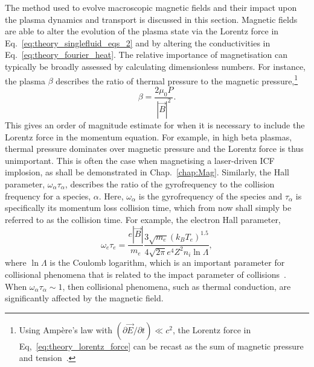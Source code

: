 The method used to evolve macroscopic magnetic fields and their impact upon the plasma dynamics and transport is discussed in this section.
Magnetic fields are able to alter the evolution of the plasma state via the Lorentz force in Eq.~\ref{eq:theory_singlefluid_eqs_2} and by altering the conductivities in Eq.~\ref{eq:theory_fourier_heat}.
The relative importance of magnetisation can typically be broadly assessed by calculating dimensionless numbers.
For instance, the plasma $\beta$ describes the ratio of thermal pressure to the magnetic pressure,\footnote{Using Amp\`ere's law with $(\partial \vec{E} / \partial t) \ll c^2$, the Lorentz force in Eq,~\ref{eq:theory_lorentz_force} can be recast as the sum of magnetic pressure and tension~\cite{oneill_modelling_2023}.}
\begin{equation}
    \beta = \frac{2 \mu_0 P}{|\vec{B}|^2}.
\end{equation}
This gives an order of magnitude estimate for when it is necessary to include the Lorentz force in the momentum equation.
For example, in high beta plasmas, thermal pressure dominates over magnetic pressure and the Lorentz force is thus unimportant.
This is often the case when magnetising a laser-driven \ac{ICF} implosion, as shall be demonstrated in Chap.~\ref{chap:Mag}.
Similarly, the Hall parameter, $\omega_\alpha \tau_\alpha$, describes the ratio of the gyrofrequency to the collision frequency for a species, $\alpha$.
Here, $\omega_\alpha$ is the gyrofrequency of the species and $\tau_\alpha$ is specifically its momentum loss collision time, which from now shall simply be referred to as the collision time.
For example, the electron Hall parameter,
\begin{equation}
    \omega_e \tau_e = \frac{e |\vec{B}|}{m_e} \frac{3\sqrt{m_e} (k_B T_e)^{1.5}}{4 \sqrt{2\pi} e^4 Z^2 n_i \ln \Lambda },
\end{equation}
where $\ln\Lambda$ is the Coulomb logarithm, which is an important parameter for collisional phenomena that is related to the impact parameter of collisions~\cite{ramazanov_coulomb_2001,kodanova_investigation_2015,lin_temperature_2023}.
When $\omega_\alpha \tau_\alpha \sim 1$, then collisional phenomena, such as thermal conduction, are significantly affected by the magnetic field.

